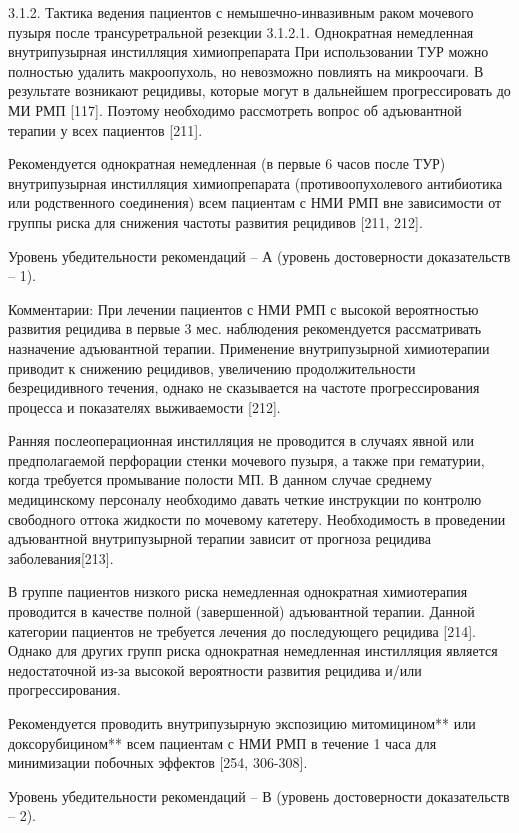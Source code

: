 3.1.2. Тактика ведения пациентов с немышечно-инвазивным раком мочевого пузыря после трансуретральной резекции
3.1.2.1. Однократная немедленная внутрипузырная инстилляция химиопрепарата
При использовании ТУР можно полностью удалить макроопухоль, но невозможно повлиять на микроочаги. В результате возникают рецидивы, которые могут в дальнейшем прогрессировать до МИ РМП [117]. Поэтому необходимо рассмотреть вопрос об адъювантной терапии у всех пациентов [211]. 

Рекомендуется однократная немедленная (в первые 6 часов после ТУР) внутрипузырная инстилляция химиопрепарата (противоопухолевого антибиотика или родственного соединения) всем пациентам с НМИ РМП вне зависимости от группы риска для снижения частоты развития рецидивов [211, 212].

Уровень убедительности рекомендаций – А (уровень достоверности доказательств – 1).

Комментарии: При лечении пациентов с НМИ РМП с высокой вероятностью развития рецидива в первые 3 мес. наблюдения рекомендуется рассматривать назначение адъювантной терапии. Применение внутрипузырной химиотерапии приводит к снижению рецидивов, увеличению продолжительности безрецидивного течения, однако не сказывается на частоте прогрессирования процесса и показателях выживаемости [212]. 

Ранняя послеоперационная инстилляция не проводится в случаях явной или предполагаемой перфорации стенки мочевого пузыря, а также при гематурии, когда требуется промывание полости МП. В данном случае среднему медицинскому персоналу необходимо давать четкие инструкции по контролю свободного оттока жидкости по мочевому катетеру. Необходимость в проведении адъювантной внутрипузырной терапии зависит от прогноза рецидива заболевания[213].  

В группе пациентов низкого риска немедленная однократная химиотерапия проводится в качестве полной (завершенной) адъювантной терапии. Данной категории пациентов не требуется лечения до последующего рецидива [214]. Однако для других групп риска однократная немедленная инстилляция является недостаточной из-за высокой вероятности развития рецидива и/или прогрессирования. 

Рекомендуется проводить внутрипузырную экспозицию митомицином** или доксорубицином** всем пациентам с НМИ РМП в течение 1 часа для минимизации побочных эффектов [254, 306-308].

Уровень убедительности рекомендаций – В (уровень достоверности доказательств – 2).

